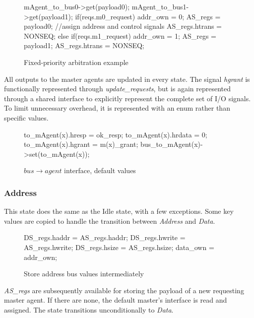 \begin{figure}[hbt]
\begin{C++}
 mAgent_to_bus0->get(payload0);
 mAgent_to_bus1->get(payload1);
 if(reqs.m0_request){
   addr_own = 0;
   AS_regs = payload0;     //assign address and control signals
   AS_regs.htrans = NONSEQ;
 }else if(reqs.m1_request){
   addr_own = 1;
   AS_regs = payload1;
   AS_regs.htrans = NONSEQ;
 }
\end{C++}
\caption{Fixed-priority arbitration example}
\label{fig:fixed-prio-example}
\end{figure}

All outputs to the master agents are updated in every state.
The signal \textit{hgrant} is functionally represented through \textit{update\_requests}, but is again represented through a shared interface to explicitly represent the complete set of I/O signals. To limit unnecessary overhead, it is represented with an enum rather than specific values.  
\begin{figure}[hbt]
\begin{C++}
to_mAgent(x).hresp = ok_resp; 
to_mAgent(x).hrdata = 0; 
to_mAgent(x).hgrant = m(x)_grant;
bus_to_mAgent(x)->set(to_mAgent(x)); 
\end{C++}
\caption{$bus\rightarrow agent$ interface, default values}
\label{fig:agent-output}
\end{figure}

		
\subsubsection{Address}
This state does the same as the Idle state, with a few exceptions. Some key values are copied to handle the transition between \textit{Address} and \textit{Data}.
\begin{figure}[hbt]
\begin{C++}
DS_regs.haddr = AS_regs.haddr; 
DS_regs.hwrite = AS_regs.hwrite; 
DS_regs.hsize = AS_regs.hsize; 
data_own = addr_own;
\end{C++}
\caption{Store address bus values intermediately}
\end{figure}

\textit{AS\_regs} are subsequently available for storing the payload of a new requesting master agent. If there are none, the default master's interface is read and assigned. The state transitions unconditionally to \textit{Data}.
\newpage
